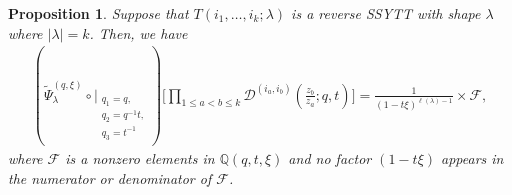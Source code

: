 \documentclass[12pt,reqno,a4paper]{amsart}
\newcommand{\comp}{\circ}
\newcommand{\cals}[1]{\mathcal{#1}}
\newcommand{\bb}[1]{\mathbb{#1}}
\numberwithin{equation}{section}
\newtheorem{prop}[thm]{Proposition}
\newcommand{\dualmap}{
\widetilde{\Psi}^{(q,\xi)}_{\lambda}
}
\theoremstyle{definition}
\begin{document}
\begin{prop}
\label{prp-a4-1634-27jul-sun}
Suppose that $T(i_1,\dots,i_k;\lambda)$ is a reverse SSYTT with shape $\lambda$ where $|\lambda| = k$. Then, we have 
\begin{align}
	(
	\dualmap
	\comp 
	\bigg|_{
		\substack{
			q_1 = q, \\
			q_2 = q^{-1}t,\\
			q_3 = t^{-1} \\
		}
	}
	)
	\Bigg[
	\prod_{1 \leq a < b \leq k}			
	\cals{D}^{(i_a,i_b)}\left(
	\frac{z_b}{z_a}
	; q, t
	\right)
	\Bigg]
	=
	\frac{1}{(1 - t\xi)^{\ell(\lambda)-1}} \times \cals{F}, 
\end{align}
where $\cals{F}$ is a nonzero elements in $\bb{Q}(q,t,\xi)$ and no factor $(1 - t\xi)$ appears in the numerator or denominator of $\cals{F}$. 
\end{prop}
\end{document}
